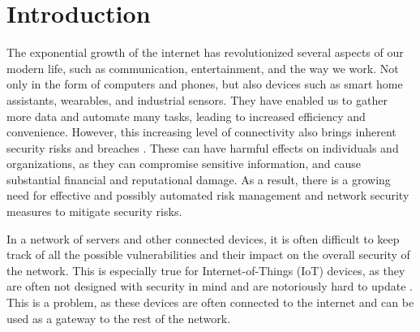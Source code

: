 \section{Introduction}
\label{sec:introduction}
The exponential growth of the internet has revolutionized several aspects of our modern life, such as communication, entertainment, and the way we work. Not only in the form of computers and phones, but also devices such as smart home assistants, wearables, and industrial sensors. They have enabled us to gather more data and automate many tasks, leading to increased efficiency and convenience. However, this increasing level of connectivity also brings inherent security risks and breaches \cite{khandelwal2016friday, wei2018casino}. These can have harmful effects on individuals and organizations, as they can compromise sensitive information, and cause substantial financial and reputational damage. As a result, there is a growing need for effective and possibly automated risk management and network security measures to mitigate security risks.

In a network of servers and other connected devices, it is often difficult to keep track of all the possible vulnerabilities and their impact on the overall security of the network. This is especially true for Internet-of-Things (IoT) devices, as they are often not designed with security in mind \cite{miettinen2017iot} and are notoriously hard to update \cite{wurm2016security}. This is a problem, as these devices are often connected to the internet and can be used as a gateway to the rest of the network. 


